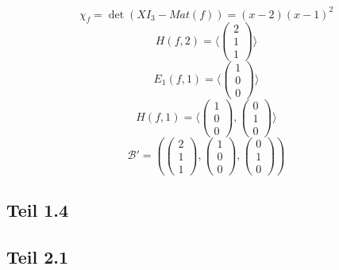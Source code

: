 \documentclass[10pt,a4paper]{article}
\begin{document}
\begin{equation}
\chi_{f} = \det(XI_{3} - Mat(f)) = (x - 2)(x - 1)^{2}
\end{equation}
\begin{equation}
H(f, 2) = \langle \begin{pmatrix}
2\\1\\1
\end{pmatrix} \rangle
\end{equation}
\begin{equation}
E_{1}(f, 1) = \langle \begin{pmatrix}
1\\0\\0
\end{pmatrix} \rangle
\end{equation}
\begin{equation}
H(f, 1) = \langle
\begin{pmatrix}
1\\0\\0
\end{pmatrix},
\begin{pmatrix}
0\\1\\0
\end{pmatrix}
\rangle
\end{equation}
\begin{equation}
\mathcal{B}' = \left(
\begin{pmatrix}
2\\1\\1
\end{pmatrix},
\begin{pmatrix}
1\\0\\0
\end{pmatrix},
\begin{pmatrix}
0\\1\\0
\end{pmatrix}
\right)
\end{equation}

\subsection*{Teil 1.4}

\subsection*{Teil 2.1}
\end{document}
